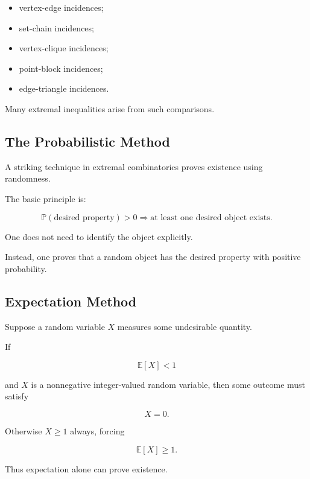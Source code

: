 \begin{itemize}
    \item vertex-edge incidences;
    \item set-chain incidences;
    \item vertex-clique incidences;
    \item point-block incidences;
    \item edge-triangle incidences.
\end{itemize}

Many extremal inequalities arise from such comparisons.

\subsection{The Probabilistic Method}
\label{subsec:probabilistic-method-extremal}

A striking technique in extremal combinatorics proves existence using
randomness.

The basic principle is:

\[
\boxed{
\mathbb{P}(\text{desired property})>0
\Longrightarrow
\text{at least one desired object exists}.
}
\]

One does not need to identify the object explicitly.

Instead, one proves that a random object has the desired property with
positive probability.

\subsection{Expectation Method}
\label{subsec:expectation-method}

Suppose a random variable \(X\) measures some undesirable quantity.

If

\[
\mathbb{E}[X]<1
\]

and \(X\) is a nonnegative integer-valued random variable, then some
outcome must satisfy

\[
X=0.
\]

Otherwise \(X\geq1\) always, forcing

\[
\mathbb{E}[X]\geq1.
\]

Thus expectation alone can prove existence.

